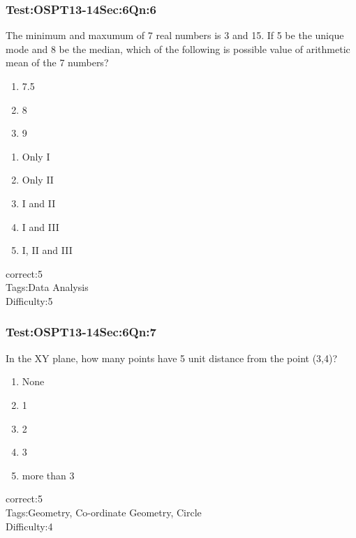 \documentclass[]{beamer}
\begin{document}
    \begin{frame}
	    \frametitle{Test:OSPT13-14\hspace{2mm}Sec:6\hspace{2mm}Qn:6}
	    The minimum and maxumum of 7 real numbers is 3 and 15. If 5 be the unique mode and 8 be the median, which of the following is possible value of arithmetic mean of the 7 numbers?
	    \begin{enumerate}[I]
	    	\item
	    	7.5
	    	\item 
	    	8
	    	\item
	    	9
	    \end{enumerate}
	   \begin{enumerate}
	        \item
	         Only I  
	        \item
	            Only II
	        \item
	          I and II
	        \item
	           I and III
	        \item
	           I, II and III
	    \end{enumerate}
	    correct:5\\   
	    Tags:Data Analysis \\
	    Difficulty:5   \\
    \end{frame}    
    \begin{frame}
	    \frametitle{Test:OSPT13-14\hspace{2mm}Sec:6\hspace{2mm}Qn:7}
	    In the XY plane, how many points have 5 unit distance from the point (3,4)?
	   \begin{enumerate}
	        \item
	           None
	        \item
	            1
	        \item
	           2
	        \item
	            3
	        \item
	           more than 3
	    \end{enumerate}
	    correct:5\\   
	    Tags:Geometry, Co-ordinate Geometry, Circle \\
	    Difficulty:4   \\
    \end{frame}    
\end{document}
